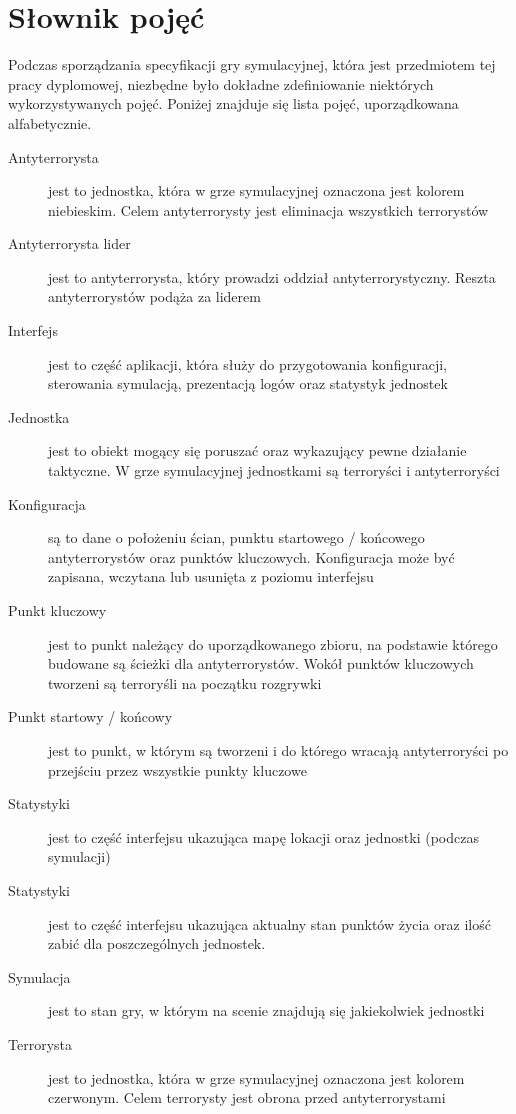\section{Słownik pojęć}\label{dictonary}
Podczas sporządzania specyfikacji gry symulacyjnej, która jest przedmiotem tej pracy dyplomowej, niezbędne było dokładne zdefiniowanie niektórych wykorzystywanych pojęć. Poniżej znajduje się lista pojęć, uporządkowana alfabetycznie.

\begin{description}
	\item[Antyterrorysta] jest to jednostka, która w grze symulacyjnej oznaczona jest kolorem niebieskim. Celem antyterrorysty jest eliminacja wszystkich terrorystów
	\item[Antyterrorysta lider] jest to antyterrorysta, który prowadzi oddział antyterrorystyczny. Reszta antyterrorystów podąża za liderem
	\item[Interfejs] jest to część aplikacji, która służy do przygotowania konfiguracji, sterowania symulacją, prezentacją logów oraz statystyk jednostek
	\item[Jednostka] jest to obiekt mogący się poruszać oraz wykazujący pewne działanie taktyczne. W grze symulacyjnej jednostkami są terroryści i antyterroryści
	\item[Konfiguracja] są to dane o położeniu ścian, punktu startowego / końcowego antyterrorystów oraz punktów kluczowych. Konfiguracja może być zapisana, wczytana lub usunięta z poziomu interfejsu
	\item[Punkt kluczowy] jest to punkt należący do uporządkowanego zbioru, na podstawie którego budowane są ścieżki dla antyterrorystów. Wokół punktów kluczowych tworzeni są terroryśli na początku rozgrywki
	\item[Punkt startowy / końcowy] jest to punkt, w którym są tworzeni i do którego wracają antyterroryści po przejściu przez wszystkie punkty kluczowe
	\item[Statystyki] jest to część interfejsu ukazująca mapę lokacji oraz jednostki (podczas symulacji)
	\item[Statystyki] jest to część interfejsu ukazująca aktualny stan punktów życia oraz ilość zabić dla poszczególnych jednostek.
	\item[Symulacja] jest to stan gry, w którym na scenie znajdują się jakiekolwiek jednostki	
	\item[Terrorysta] jest to jednostka, która w grze symulacyjnej oznaczona jest kolorem czerwonym. Celem terrorysty jest obrona przed antyterrorystami
\end{description}


